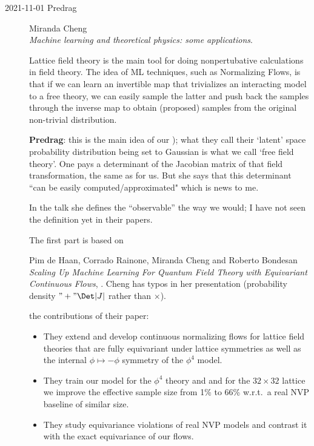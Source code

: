 \begin{description}


\item[2021-11-01 Predrag]
 Miranda Cheng \\
{\em Machine learning and theoretical physics: some applications}.

Lattice field theory is the main tool for doing nonpertubative
calculations in field theory.
The idea of ML techniques, such as Normalizing Flows, is that if we can
learn an invertible map that trivializes an interacting model to a free
theory, we can easily sample the latter and push back the samples through
the inverse map to obtain (proposed) samples from the original
non-trivial distribution.

\textbf{Predrag}: this is the main idea of our );
what they call their `latent' space probability distribution being set to
Gaussian is what we call `free field theory'. One pays a determinant of the
Jacobian matrix of that field transformation, the same as for us. But she says
that this determinant ``can be easily computed/approximated" which is news to me.

In the talk she defines the ``observable'' the way we would; I have not
seen the definition yet in their papers.

The first part is based on

Pim de Haan, Corrado Rainone, Miranda Cheng and  Roberto Bondesan%
{\em Scaling Up Machine Learning For Quantum Field Theory with
Equivariant Continuous Flows}, .
Cheng has typos in her presentation (probability density
$"+"\Det|J|$ rather than $\times$).

the contributions of their paper:
\vspace{-7pt}
\begin{itemize}
    \item They extend %
    and develop continuous normalizing flows for lattice field theories
    that are fully equivariant under lattice symmetries as well as the
    internal $\phi \mapsto -\phi$ symmetry of the $\phi^4$ model.
    \item They train our model for the $\phi^4$ theory and and for the
    $32\times 32$ lattice we improve the effective sample size from 1\%
    to 66\% w.r.t.~a real NVP baseline of similar size.
    \item They study equivariance violations of real NVP models and
    contrast it with the exact equivariance of our flows.
\end{itemize}



\end{description}
